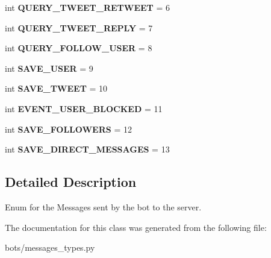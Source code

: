 \begin{DoxyCompactItemize}
\mbox{\label{classtwitter_1_1bots_1_1messages__types_1_1BotToServer_ad0cc59dfb250134e448e53fe37eb29e3}} 
int {\bfseries Q\+U\+E\+R\+Y\+\_\+\+T\+W\+E\+E\+T\+\_\+\+R\+E\+T\+W\+E\+ET} = 6
\item 
\mbox{\label{classtwitter_1_1bots_1_1messages__types_1_1BotToServer_a34b0c9518de19c77dec3064bf75a1b52}} 
int {\bfseries Q\+U\+E\+R\+Y\+\_\+\+T\+W\+E\+E\+T\+\_\+\+R\+E\+P\+LY} = 7
\item 
\mbox{\label{classtwitter_1_1bots_1_1messages__types_1_1BotToServer_ae59feacd2e18ec6f834fab1c78fcaf5b}} 
int {\bfseries Q\+U\+E\+R\+Y\+\_\+\+F\+O\+L\+L\+O\+W\+\_\+\+U\+S\+ER} = 8
\item 
\mbox{\label{classtwitter_1_1bots_1_1messages__types_1_1BotToServer_a56395fa1744d9e0cc651db321dbba982}} 
int {\bfseries S\+A\+V\+E\+\_\+\+U\+S\+ER} = 9
\item 
\mbox{\label{classtwitter_1_1bots_1_1messages__types_1_1BotToServer_a2d5b514d5acd789996554334b6400168}} 
int {\bfseries S\+A\+V\+E\+\_\+\+T\+W\+E\+ET} = 10
\item 
\mbox{\label{classtwitter_1_1bots_1_1messages__types_1_1BotToServer_a8a6114726265b63d224fe3c0bb22e327}} 
int {\bfseries E\+V\+E\+N\+T\+\_\+\+U\+S\+E\+R\+\_\+\+B\+L\+O\+C\+K\+ED} = 11
\item 
\mbox{\label{classtwitter_1_1bots_1_1messages__types_1_1BotToServer_a142b0d8e3ee184b8a6ad1283ca23ad7a}} 
int {\bfseries S\+A\+V\+E\+\_\+\+F\+O\+L\+L\+O\+W\+E\+RS} = 12
\item 
\mbox{\label{classtwitter_1_1bots_1_1messages__types_1_1BotToServer_a0bbf4b687a54dca2b3ab3b4c6c01cc4a}} 
int {\bfseries S\+A\+V\+E\+\_\+\+D\+I\+R\+E\+C\+T\+\_\+\+M\+E\+S\+S\+A\+G\+ES} = 13
\end{DoxyCompactItemize}


\subsection{Detailed Description}
Enum for the Messages sent by the bot to the server. 

The documentation for this class was generated from the following file\+:\begin{DoxyCompactItemize}
\item 
bots/messages\+\_\+types.\+py\end{DoxyCompactItemize}
